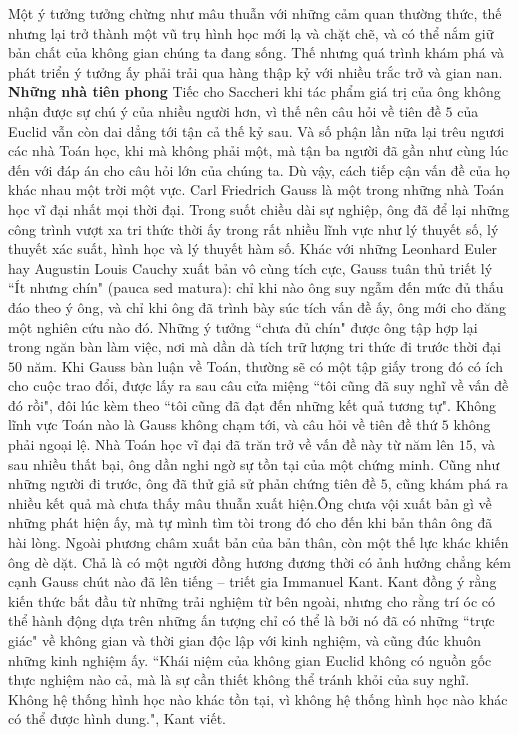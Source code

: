 \begin{multicols}{2}
	Một ý tưởng tưởng chừng như mâu thuẫn với những cảm quan thường thức, thế nhưng lại trở thành một vũ trụ hình học mới lạ và chặt chẽ, và có thể nắm giữ bản chất của không gian chúng ta đang sống. Thế nhưng quá trình khám phá và phát triển ý tưởng ấy phải trải qua hàng thập kỷ với nhiều trắc trở và gian nan.
	\vskip 0.1cm
	\textbf{\color{lichsutoanhoc}Những nhà tiên phong}
	\vskip 0.1cm
	Tiếc cho Saccheri khi tác phẩm giá trị của ông không nhận được sự chú ý của nhiều người hơn, vì thế nên câu hỏi về tiên đề $5$ của Euclid vẫn còn dai dẳng tới tận cả thế kỷ sau. Và số phận lần nữa lại trêu ngươi các nhà Toán học, khi mà không phải một, mà tận ba người đã gần như cùng lúc đến với đáp án cho câu hỏi lớn của chúng ta. Dù vậy, cách tiếp cận vấn đề của họ khác nhau một trời một vực.
	\vskip 0.1cm
	Carl Friedrich Gauss là một trong những nhà Toán học vĩ đại nhất mọi thời đại. Trong suốt chiều dài sự nghiệp, ông đã để lại những công trình vượt xa tri thức thời ấy trong rất nhiều lĩnh vực như lý thuyết số, lý thuyết xác suất, hình học và lý thuyết hàm số. Khác với những Leonhard Euler hay Augustin Louis Cauchy xuất bản vô cùng tích cực, Gauss tuân thủ triết lý ``Ít nhưng chín" (pauca sed matura): chỉ khi nào ông suy ngẫm đến mức đủ thấu đáo theo ý ông, và chỉ khi ông đã trình bày súc tích vấn đề ấy, ông mới cho đăng một nghiên cứu nào đó. Những ý tưởng ``chưa đủ chín" được ông tập hợp lại trong ngăn bàn làm việc, nơi mà dần dà tích trữ lượng tri thức đi trước thời đại $50$ năm. Khi Gauss bàn luận về Toán, thường sẽ có một tập giấy trong đó có ích cho cuộc trao đổi, được lấy ra sau câu cửa miệng ``tôi cũng đã suy nghĩ về vấn đề đó rồi", đôi lúc kèm theo ``tôi cũng đã đạt đến những kết quả tương tự".
	\vskip 0.1cm
	Không lĩnh vực Toán nào là Gauss không chạm tới, và câu hỏi về tiên đề thứ $5$ không phải ngoại lệ. Nhà Toán học vĩ đại đã trăn trở về vấn đề này từ năm lên $15$, và sau nhiều thất bại, ông dần nghi ngờ sự tồn tại của một chứng minh. Cũng như những người đi trước, ông đã thử giả sử phản chứng tiên đề $5$, cũng khám phá ra nhiều kết quả mà chưa thấy mâu thuẫn xuất hiện.Ông chưa vội xuất bản gì về những phát hiện ấy, mà tự mình tìm tòi trong đó cho đến khi bản thân ông đã hài lòng. Ngoài phương châm xuất bản của bản thân, còn một thế lực khác khiến ông dè dặt. Chả là có một người đồng hương đương thời có ảnh hưởng chẳng kém cạnh Gauss chút nào đã lên tiếng -- triết gia Immanuel Kant. Kant đồng ý rằng kiến thức bắt đầu từ những trải nghiệm từ bên ngoài, nhưng cho rằng trí óc có thể hành động dựa trên những ấn tượng chỉ có thể là bởi nó đã có những ``trực giác" về không gian và thời gian độc lập với kinh nghiệm, và cũng đúc khuôn những kinh nghiệm ấy. ``Khái niệm của không gian Euclid không có nguồn gốc thực nghiệm nào cả, mà là sự cần thiết không thể tránh khỏi của suy nghĩ. Không hệ thống hình học nào khác tồn tại, vì không hệ thống hình học nào khác có thể được hình dung.", Kant viết.

\end{multicols}
